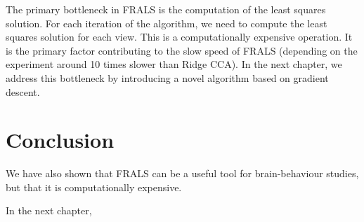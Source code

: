 The primary bottleneck in FRALS is the computation of the least squares solution.
For each iteration of the algorithm, we need to compute the least squares solution for each view.
This is a computationally expensive operation.
It is the primary factor contributing to the slow speed of FRALS (depending on the experiment around 10 times slower than Ridge CCA).
In the next chapter, we address this bottleneck by introducing a novel algorithm based on gradient descent.

\section{Conclusion}\label{sec:conclusion}

We have also shown that FRALS can be a useful tool for brain-behaviour studies, but that it is computationally expensive.

In the next chapter,